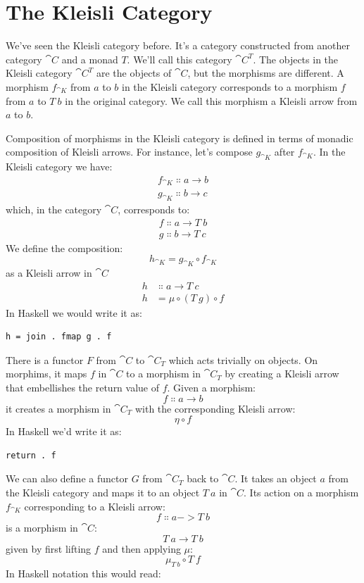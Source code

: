 \section{The Kleisli Category}

We've seen the Kleisli category before. It's a category constructed from
another category $\cat{C}$ and a monad $T$. We'll call this
category $\cat{C}^T$. The objects in the Kleisli category
$\cat{C}^T$ are the objects of $\cat{C}$, but the morphisms
are different. A morphism $f_{\cat{K}}$ from $a$ to $b$ in
the Kleisli category corresponds to a morphism $f$ from
$a$ to $T\ b$ in the original category. We call this
morphism a Kleisli arrow from $a$ to $b$.

Composition of morphisms in the Kleisli category is defined in terms of
monadic composition of Kleisli arrows. For instance, let's compose
$g_{\cat{K}}$ after $f_{\cat{K}}$. In the Kleisli category we have:
\begin{gather*}
f_{\cat{K}} \Colon a \to b \\
g_{\cat{K}} \Colon b \to c
\end{gather*}
which, in the category $\cat{C}$, corresponds to:
\begin{gather*}
f \Colon a \to T\ b \\
g \Colon b \to T\ c
\end{gather*}
We define the composition:
\[h_{\cat{K}} = g_{\cat{K}} \circ f_{\cat{K}}\]
as a Kleisli arrow in $\cat{C}$
\begin{align*}
h &\Colon a \to T\ c \\
h &= \mu \circ (T\ g) \circ f
\end{align*}
In Haskell we would write it as:

\begin{Verbatim}
h = join . fmap g . f
\end{Verbatim}
There is a functor $F$ from $\cat{C}$ to $\cat{C}_T$
which acts trivially on objects. On morphims, it maps $f$ in
$\cat{C}$ to a morphism in $\cat{C}_T$ by creating a
Kleisli arrow that embellishes the return value of $f$. Given a
morphism:
\[f \Colon a \to b\]
it creates a morphism in $\cat{C}_T$ with the
corresponding Kleisli arrow:
\[\eta \circ f\]
In Haskell we'd write it as:

\begin{Verbatim}
return . f
\end{Verbatim}
We can also define a functor $G$ from $\cat{C}_T$
back to $\cat{C}$. It takes an object $a$ from the Kleisli
category and maps it to an object $T\ a$ in $\cat{C}$. Its action 
on a morphism $f_{\cat{K}}$ corresponding to a Kleisli arrow:
\[f \Colon a -> T\ b\]
is a morphism in $\cat{C}$:
\[T\ a \to T\ b\]
given by first lifting $f$ and then applying $\mu$:
\[\mu_{T\ b} \circ T\ f\]
In Haskell notation this would read:

